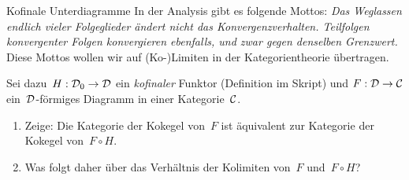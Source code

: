 \documentclass{pizzablatt}
\begin{document}
\small
\begin{aufgabe*}{Kofinale Unterdiagramme}
In der Analysis gibt es folgende Mottos: \emph{Das Weglassen endlich vieler Folgeglieder
ändert nicht das Konvergenzverhalten. Teilfolgen konvergenter Folgen
konvergieren ebenfalls, und zwar gegen denselben Grenzwert.} Diese Mottos
wollen wir auf (Ko-)Limiten in der Kategorientheorie übertragen.

Sei dazu~$H : \mathcal{D}_0 \to \mathcal{D}$ ein \emph{kofinaler} Funktor (Definition im Skript)
und $F : \mathcal{D} \to \mathcal{C}$ ein~$\mathcal{D}$-förmiges Diagramm in einer Kategorie~$\mathcal{C}$.
\begin{enumerate}
\item
Zeige: Die Kategorie der Kokegel von~$F$ ist äquivalent zur Kategorie der
Kokegel von~$F \circ H$.
\item Was folgt daher über das Verhältnis der Kolimiten von~$F$ und~$F \circ
H$?
\end{enumerate}
\end{aufgabe*}
\end{document}
